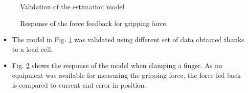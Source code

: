 \begin{minipage}{0.5\linewidth}
\begin{figure}[H]
\centering
\resizebox{0.8\textwidth}{!}{
}
\caption{Validation of the estimation model}
\label{fig:validation}
\end{figure}

\end{minipage}
\begin{minipage}{0.5\linewidth}
\begin{figure}[H]
\centering
\resizebox{0.8\textwidth}{!}{
}
\caption{Response of the force feedback for gripping force}
\label{fig:feedback_meas}
\end{figure}
\end{minipage}

\begin{minipage}{0.5\linewidth}

\begin{center}
	\label{tab:UDPMeasurements}
\end{center}
\end{minipage}

\begin{itemize}
\item The model in Fig. \ref{fig:validation} was validated using different set of data obtained thanks to a load cell.
\item Fig. \ref{fig:feedback_meas} shows the response of the model when clamping a finger. As no equipment was available for measuring the gripping force, the force fed back is compared to current and error in position.
\end{itemize}
